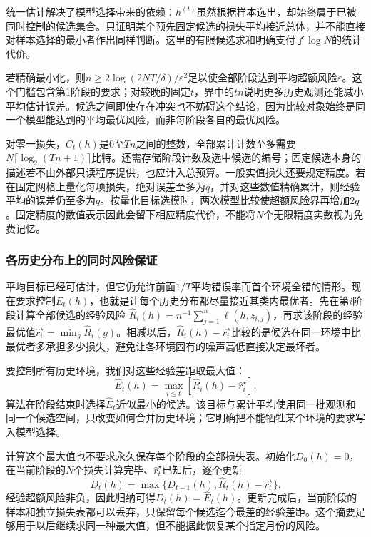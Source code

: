 统一估计解决了模型选择带来的依赖：$h^{(t)}$虽然根据样本选出，却始终属于已被同时控制的候选集合。只证明某个预先固定候选的损失平均接近总体，并不能直接对样本选择的最小者作出同样判断。这里的有限候选求和明确支付了$\log N$的统计代价。

若精确最小化，则$n\geq2\log(2NT/\delta)/\varepsilon^2$足以使全部阶段达到平均超额风险$\varepsilon$。这个门槛包含第1阶段的要求；对较晚的固定$t$，界中的$tn$说明更多历史观测还能减小平均估计误差。候选之间即使存在冲突也不妨碍这个结论，因为比较对象始终是同一个模型能达到的平均最优风险，而非每阶段各自的最优风险。

对零一损失，$C_t(h)$是$0$至$Tn$之间的整数，全部累计计数至多需要$N\lceil\log_2(Tn+1)\rceil$比特。还需存储阶段计数及选中候选的编号；固定候选本身的描述若不由外部只读程序提供，也应计入总预算。一般实值损失还要规定精度。若在固定网格上量化每项损失，绝对误差至多为$q$，并对这些数值精确累计，则经验平均的误差仍至多为$q$。按量化目标选模时，两次模型比较使超额风险界再增加$2q$。固定精度的数值表示因此会留下相应精度代价，不能将$N$个无限精度实数视为免费记忆。

\subsubsection{各历史分布上的同时风险保证}

平均目标已经可估计，但它仍允许前面$1/T$平均错误率而首个环境全错的情形。现在要求控制$E_t(h)$，也就是让每个历史分布都尽量接近其类内最优者。先在第$i$阶段计算全部候选的经验风险
$\widehat R_i(h)=n^{-1}\sum_{j=1}^n\ell(h,z_{i,j})$，再求该阶段的经验最优值$\widehat r_i^\star=\min_g\widehat R_i(g)$。相减以后，$\widehat R_i(h)-\widehat r_i^\star$比较的是候选在同一环境中比最优者多承担多少损失，避免让各环境固有的噪声高低直接决定最坏者。

要控制所有历史环境，我们对这些经验差距取最大值：
\[
 \widehat E_t(h)=\max_{i\leq t}
       [\widehat R_i(h)-\widehat r_i^\star].
\]
算法在阶段结束时选择$\widehat E_t$近似最小的候选。该目标与累计平均使用同一批观测和同一个候选空间，只改变如何合并历史环境；它明确把不能牺牲某个环境的要求写入模型选择。

计算这个最大值也不要求永久保存每个阶段的全部损失表。初始化$D_0(h)=0$，在当前阶段的$N$个损失计算完毕、$\widehat r_t^\star$已知后，逐个更新
\[
 D_t(h)=\max\{D_{t-1}(h),\widehat R_t(h)-\widehat r_t^\star\}.
\]
经验超额风险非负，因此归纳可得$D_t(h)=\widehat E_t(h)$。更新完成后，当前阶段的样本和独立损失表都可以丢弃，只保留每个候选迄今最差的经验差距。这个摘要足够用于以后继续求同一种最大值，但不能据此恢复某个指定月份的风险。

